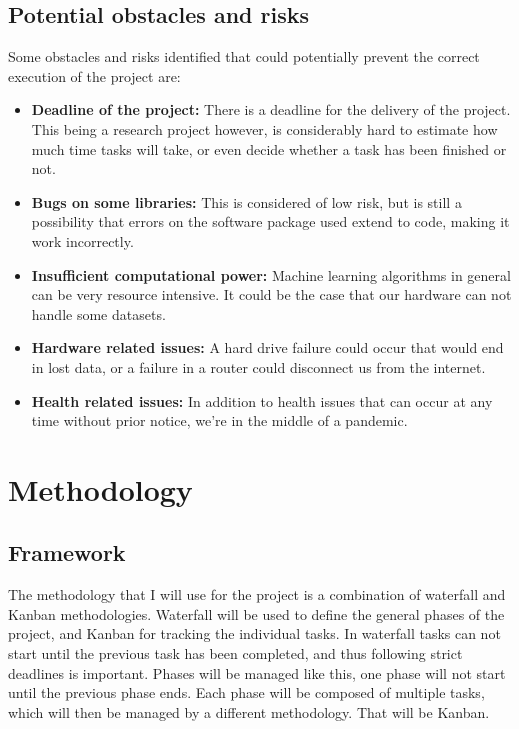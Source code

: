 \subsection{Potential obstacles and risks}

Some obstacles and risks identified that could potentially prevent the correct exec\-ution of the project are:

\begin{itemize}
    \item \textbf{Deadline of the project:} There is a deadline for the delivery of the project. This being a research project however, is considerably hard to estimate how much time tasks will take, or even decide whether a task has been finished or not.
    \item \textbf{Bugs on some libraries:} This is considered of low risk, but is still a possibility that errors on the software package used extend to code, making it work in\-correctly.
    \item \textbf{Insufficient computational power:} Machine learning algorithms in general can be very resource intensive. It could be the case that our hardware can not handle some datasets. 
    \item \textbf{Hardware related issues:} A hard drive failure could occur that would end in lost data, or a failure in a router could disconnect us from the internet.
    \item \textbf{Health related issues:} In addition to health issues that can occur at any time without prior notice, we're in the middle of a pandemic.
\end{itemize}


\section{Methodology}

\subsection{Framework}

The methodology that I will use for the project is a combination of waterfall and Kanban methodologies. Waterfall will be used to define the general phases of the project, and Kanban for tracking the individual tasks. In waterfall tasks can not start until the previous task has been completed, and thus following strict deadlines is important. Phases will be managed like this, one phase will not start until the previous phase ends. Each phase will be composed of multiple tasks, which will then be managed by a different methodology. That will be Kanban.

